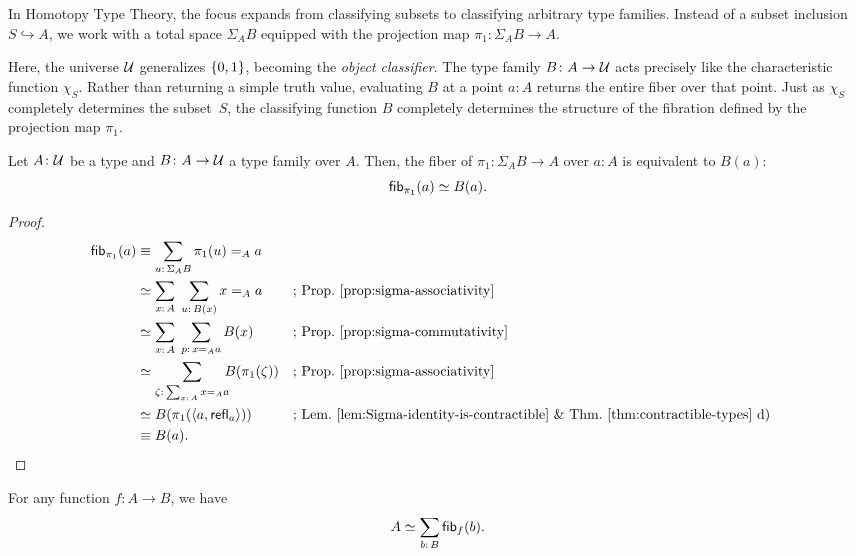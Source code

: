 In Homotopy Type Theory, the focus expands from classifying subsets to classifying arbitrary type families. Instead of a subset inclusion $S \hookrightarrow A$, we work with a total space $\Sigma_AB$ equipped with the projection map $\pi_1\colon\Sigma_AB\to A$.

Here, the universe $\mathcal U$ generalizes $\{0,1\}$, becoming the \textsl{object classifier}. The type family $B \colon A \to \univ$ acts precisely like the characteristic function $\chi_S$. Rather than returning a simple truth value, evaluating $B$ at a point $a \colon A$ returns the entire fiber over that point. Just as $\chi_S$ completely determines the subset~$S$, the classifying function $B$ completely determines the structure of the fibration defined by the projection map $\pi_1$.

\begin{prop}\label{prop:pi_1-fibers}
    Let\/ $A\colon\univ$ be a type and\/ $B\colon A\to\univ$ a type family over $A$. Then, the fiber of\/ $\pi_1\colon\Sigma_AB\to A$ over\/ $a\colon A$ is equivalent to\/ $B(a)$:
    \[
        \mathsf{fib}_{\pi_1}(a) \simeq B(a).
    \]
\end{prop}

\begin{proof}
    \begin{align*}
        \fun{fib}_{\pi_1}(a)
            &\equiv\sum_{u\colon\Sigma_AB}\pi_1(u)\eq Aa\\
            &\simeq\sum_{x\colon A}\;\sum_{u\colon B(x)}
                x\eq Aa
                &&\text{; Prop.~\ref{prop:sigma-associativity}}\\
            &\simeq\sum_{x\colon A}\;\sum_{p\colon x\eq Aa}
                B(x)
                &&\text{; Prop.~\ref{prop:sigma-commutativity}}\\
            &\simeq\sum_{\zeta\colon\sum_{x\colon A}
                x\eq Aa}\!\!\!B(\pi_1(\zeta))
                &&\text{; Prop.~\ref{prop:sigma-associativity}}\\
            &\simeq B(\pi_1(\dep{a,\fun{refl}_a}))
                &&\text{; Lem.~\ref{lem:Sigma-identity-is-contractible} \& Thm.~\ref{thm:contractible-types}~d)}\\
            &\equiv B(a).
    \end{align*}\qedhere
\end{proof}


\begin{lem}\label{lem:fib-reconstruction}
    For any function\/ $f\colon A\to B$, we have
    \[
        A \simeq \sum_{b\colon B}\fun{fib}_f(b).
    \]
\end{lem}


